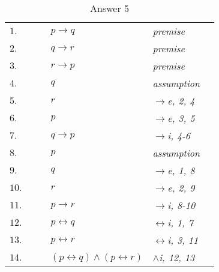 \documentclass[12pt]{article}
\begin{document}
\begin{table}[H]
	\centering
	\caption{Answer 5}
	\vspace{5px}
	\begin{tabular}{*6{l}}
		$1.$ & & & $p \rightarrow q$ & \textit{premise} & \\
		
		$2.$ & & & $q \rightarrow r$ & \textit{premise} & \\
		
		$3.$ & & & $r \rightarrow p$ & \textit{premise} & \\
		\cline{2-6}
		
		$4.$ &\multicolumn{1}{|c}{} & & $q$ &\textit{assumption} &\multicolumn{1}{c|}{}\\
		
		$5.$ &\multicolumn{1}{|c}{} & & $r$ &\textit{$\rightarrow$e, 2, 4} &\multicolumn{1}{c|}{}\\
		
		$6.$ &\multicolumn{1}{|c}{} & & $p$ &\textit{$\rightarrow$e, 3, 5} &\multicolumn{1}{c|}{}\\ \cline{2-6}
		
		$7.$ & & & $q \rightarrow p$ & \textit{$\rightarrow$i, 4-6} & \\ \cline{2-6}
		
		$8.$ &\multicolumn{1}{|c}{} & & $p$ &\textit{assumption} &\multicolumn{1}{c|}{}\\
		
		$9.$ &\multicolumn{1}{|c}{} & & $q$ &\textit{$\rightarrow$e, 1, 8} &\multicolumn{1}{c|}{}\\
		
		$10.$ &\multicolumn{1}{|c}{} & & $r$ &\textit{$\rightarrow$e, 2, 9} &\multicolumn{1}{c|}{}\\ \cline{2-6}
		
		$11.$ & & & $p \rightarrow r$ & \textit{$\rightarrow$i, 8-10} & \\
		
		$12.$ & & & $p \leftrightarrow q$ & \textit{$\leftrightarrow$i, 1, 7} & \\
		
		$13.$ & & & $p \leftrightarrow r$ & \textit{$\leftrightarrow$i, 3, 11} & \\
		
		$14.$ & & & $(p \leftrightarrow q) \land (p \leftrightarrow r)$ & \textit{$\land$i, 12, 13} & \\
	
	\end{tabular}
\end{table}
\end{document}
